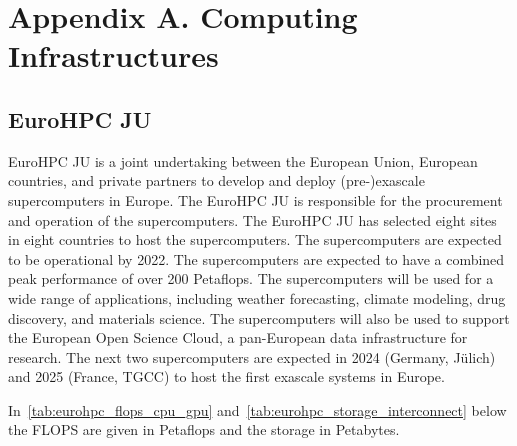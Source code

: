 
\clearpage
\appendix
\section*{Appendix A. Computing Infrastructures}
\label{sec:app:architectures}


\subsection*{EuroHPC JU}
\label{sec:arch:eurohpc-ju}

EuroHPC JU is a joint undertaking between the European Union, European countries, and private partners to develop and deploy (pre-)exascale supercomputers in Europe. 
The EuroHPC JU is responsible for the procurement and operation of the supercomputers. The EuroHPC JU has selected eight sites in eight countries to host the supercomputers. The supercomputers are expected to be operational by 2022. The supercomputers are expected to have a combined peak performance of over 200 Petaflops. The supercomputers will be used for a wide range of applications, including weather forecasting, climate modeling, drug discovery, and materials science. The supercomputers will also be used to support the European Open Science Cloud, a pan-European data infrastructure for research.
The next two supercomputers are expected in 2024 (Germany, Jülich) and 2025 (France, TGCC) to host the first exascale systems in Europe.

In~\cref{tab:eurohpc_flops_cpu_gpu} and~\cref{tab:eurohpc_storage_interconnect} below the FLOPS are given in Petaflops and the storage in Petabytes.


